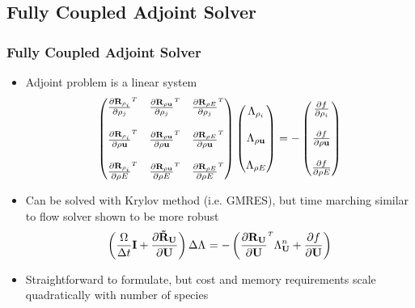 \documentclass{beamer}
\begin{document}
\subsection{Fully Coupled Adjoint Solver}

\begin{frame}
  \frametitle{Fully Coupled Adjoint Solver}
  \begin{itemize}
    \item Adjoint problem is a linear system
      \begin{equation*}
        \begin{pmatrix}
          \rtdiff{\rho_i}{\rho_j} & 
          \rtdiff{\rho \vu}{\rho_j} & 
          \rtdiff{\rho E}{\rho_j} \\
          \\
          \rtdiff{\rho_i}{\rho \vu} & 
          \rtdiff{\rho \vu}{\rho \vu} & 
          \rtdiff{\rho E}{\rho \vu} \\
          \\
          \rtdiff{\rho_i}{\rho E} &
          \rtdiff{\rho \vu}{\rho E} &
          \rtdiff{\rho E}{\rho E}
        \end{pmatrix}
        \begin{pmatrix}
          \adjlam{\rho_i} \\ \\
          \adjlam{\rho \vu} \\ \\
          \adjlam{\rho E}
        \end{pmatrix}
        = -
        \begin{pmatrix}
          \pd{f}{\rho_i} \\ \\
          \pd{f}{\rho \vu} \\ \\
          \pd{f}{\rho E}
        \end{pmatrix}
      \end{equation*}
    \item Can be solved with Krylov method (i.e. GMRES), but time marching
      similar to flow solver shown to be more robust
      \begin{equation*}
        \left( \frac{\vol}{\Delta t} \mi + \druduapprox \right)
        \Delta \adjlam{}
        = - \left( \rtdiff{\mU}{\mU} \adjlam{\mU}^{n} + \pd{f}{\mU} \right)
      \end{equation*}
    \item Straightforward to formulate, but cost and memory requirements
      scale quadratically with number of species
      
  \end{itemize}
\end{frame}
\end{document}
